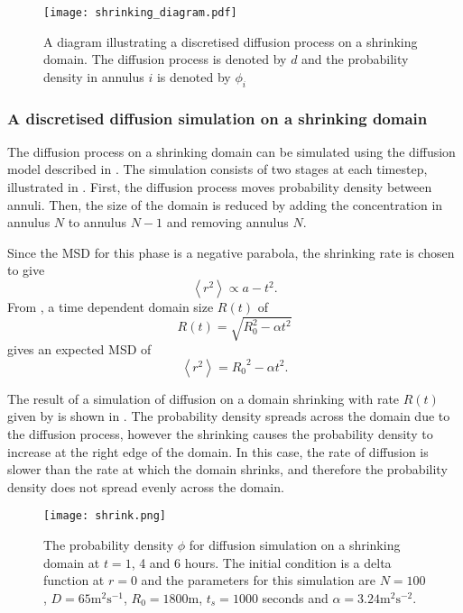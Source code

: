    \begin{figure} [h]
       \centering
           \texttt{[image: shrinking\_diagram.pdf]}
           \caption{A diagram illustrating a discretised diffusion process on a shrinking domain. The diffusion process is denoted by $d$ and the probability density in annulus $i$ is denoted by $\phi_i$}
       \label{fig:shrinking_diagram}
   \end{figure}
%
\subsubsection{A discretised diffusion simulation on a shrinking domain}
The diffusion process on a shrinking domain can be simulated using the diffusion model described in . The simulation consists of two stages at each timestep, illustrated in . First, the diffusion process moves probability density between annuli. Then, the size of the domain is reduced by adding the concentration in annulus $N$ to annulus $N-1$ and removing annulus $N$.

Since the MSD for this phase is a negative parabola, the shrinking rate is chosen to give
%
 \begin{equation}
 \left<r^2\right> \propto a - t^2.
 \label{eqn:MSD_shrink}
 \end{equation}
%
From , a time dependent domain size $R(t)$ of
%
\begin{equation}
R(t) = \sqrt{R_0^2 - \alpha t^2}
\label{eqn:Rt}
\end{equation}
%
gives an expected MSD of
 \begin{equation}
 \left<r^2\right> = {R_0}^2 -\alpha t^2.
 \end{equation}

The result of a simulation of diffusion on a domain shrinking with rate $R(t)$ given by  is shown in . The probability density spreads across the domain due to the diffusion process, however the shrinking causes the probability density to increase at the right edge of the domain. In this case, the rate of diffusion is slower than the rate at which the domain shrinks, and therefore the probability density does not spread evenly across the domain.
%
    \begin{figure} [h]
        \centering
            \texttt{[image: shrink.png]}
            \caption{The probability density $\phi$ for diffusion simulation on a shrinking domain at $t = 1$, 4 and 6 hours. The initial condition is a delta function at $r = 0$ and the
             parameters for this simulation are $N = 100$, $D = 65\mathrm{m^2s^{-1}}$, $R_0 = 1800$m, $t_s = 1000$ seconds and $\alpha  = 3.24 \mathrm{m^2s^{-2}}$.}
        \label{fig:shrink_phi}
    \end{figure}
